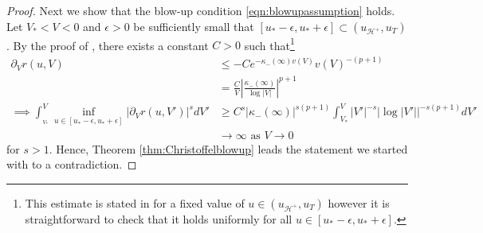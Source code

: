 \documentclass{article}
\newcommand{\vol}{\text{vol}}
\begin{document}
\begin{proof}

Next we show that the blow-up condition \eqref{eqn:blowupassumption} holds. Let $V_*<V<0$ and $\epsilon>0$ be sufficiently small that $[u_*-\epsilon,u_*+\epsilon]\subset (u_{\mathcal{H}^+},u_T)$. By the proof of \cite[Proposition 4.25]{Sbie22a}, there exists a constant $C>0$ such that\footnote{This estimate is stated in \cite{Sbie22a} for a fixed value of $u\in(u_{\mathcal{H}^+},u_T)$ however it is straightforward to check that it holds uniformly for all $u\in[u_*-\epsilon,u_*+\epsilon]$.}
\begin{equation} \begin{split}
          \partial_Vr(u,V)&\leq -Ce^{-\kappa_-(\infty)v(V)}v(V)^{-(p+1)}\\
     &=\frac{C}{V}\left|\frac{\kappa_-(\infty)}{\log|V|}\right|^{p+1}\\
     \implies      \int_{_{V_*}}^V\inf_{u\in[u_*-\epsilon,u_*+\epsilon]}\left|\partial_Vr(u,V')\right|^{s}dV'&\geq C^{s}|\kappa_-(\infty)|^{s(p+1)}\int_{V_*}^V|V'|^{-s}\left|\log|V'|\right|^{-s(p+1)}dV'\\
     &\to\infty\text{ as }V\to0
\end{split}
\end{equation}  
for $s>1$.
 Hence, Theorem \ref{thm:Christoffelblowup} leads the statement we started with to a contradiction.
\end{proof}
\end{document}
